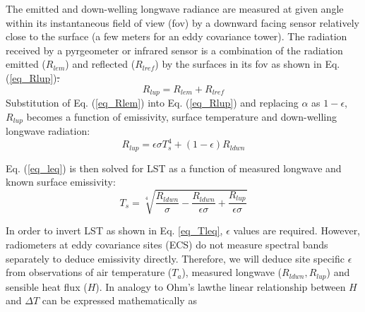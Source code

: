 \documentclass[fleqn,10pt]{wlscirep}
\providecommand{\DIFaddtex}[1]{{\protect\color{blue}\uwave{#1}}} %
\providecommand{\DIFdeltex}[1]{{\protect\color{red}\sout{#1}}}                      %
\providecommand{\DIFaddbegin}{} %
\providecommand{\DIFaddend}{} %
\providecommand{\DIFdelbegin}{} %
\providecommand{\DIFdelend}{} %
\providecommand{\DIFadd}[1]{\texorpdfstring{\DIFaddtex{#1}}{#1}} %
\providecommand{\DIFdel}[1]{\texorpdfstring{\DIFdeltex{#1}}{}} %
\begin{document}
The emitted and down-welling longwave radiance are measured at given angle within its instantaneous field of view (fov) by a downward facing sensor relatively close to the surface (a few meters for an eddy covariance tower). The radiation received by a pyrgeometer or infrared sensor is a combination of the radiation emitted ($R_{lem}$) and reflected ($R_{lref}$) by the surfaces in its fov as shown in Eq. (\ref{eq_Rlup})\DIFdelbegin \DIFdel{. 
}\DIFdelend \DIFaddbegin \DIFadd{:
}\DIFaddend \begin{equation}\label{eq_Rlup}
R_{lup} = R_{lem} + R_{lref}
\end{equation}
Substitution of Eq. (\ref{eq_Rlem}) into Eq. (\ref{eq_Rlup}) and replacing  $\alpha$ as $1 - \epsilon$, $R_{lup}$ becomes a function of emissivity, surface temperature and down-welling longwave radiation:
\begin{equation}\label{eq_leq}
R_{lup}= \epsilon \sigma T_{s}^{4} + (1- \epsilon)R_{ldwn}
\end{equation}

Eq. (\ref{eq_leq}) is then solved for LST as a function of measured longwave and known surface emissivity:
\begin{equation}\label{eq_Tleq}
T_{s} = \sqrt[4]{\frac{R_{ldwn}}{\sigma} - \frac{R_{ldwn}}{\epsilon \sigma} + \frac{R_{lup}}{\epsilon \sigma}}
\end{equation}

In order to invert LST as shown in Eq. \eqref{eq_Tleq}, $\epsilon$ values are required. However, radiometers at eddy covariance sites (ECS) do not measure spectral bands separately to deduce emissivity directly. Therefore, we will deduce site specific $\epsilon$ from observations of air temperature ($T_a$), measured longwave (\DIFdelbegin \DIFdel{$R_{ldwn},R_{lup}$}\DIFdelend \DIFaddbegin \DIFadd{$R_{ldwn}$, $R_{lup}$}\DIFaddend ) and sensible heat flux ($H$)\cite{holmes2016cloud}. In analogy to Ohm's law\DIFaddbegin \DIFadd{, }\DIFaddend the linear relationship between $H$ and $\Delta T$ can be expressed mathematically as\DIFdelbegin %
\end{document}

